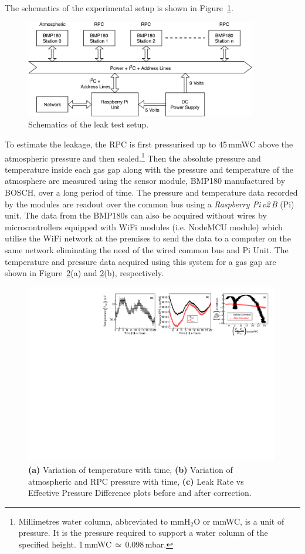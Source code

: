 \documentclass[a4paper,12pt,twoside]{article}
\begin{document}
The schematics of the experimental setup is shown in Figure~\ref{fig:schematics}.
\begin{figure}
  \centering
  \includegraphics[width=0.9\textwidth]{leaktest_setup.png}
  \caption{Schematics of the leak test setup.}
  \label{fig:schematics}
\end{figure}
To estimate the leakage, the RPC is first pressurised up to 45\,mmWC above the atmospheric pressure and then sealed.\footnote{Millimetres water column, abbreviated to mmH$_2$O or mmWC, is a unit of pressure. It is the pressure required to support a water column of the specified height. 1\,mmWC\,$\simeq$\,0.098\,mbar.} Then the absolute pressure and temperature inside each gas gap along with the pressure and temperature of the atmosphere are measured using the sensor module, BMP180 manufactured by BOSCH\cite{bmp180}, over a long period of time. The pressure and temperature data recorded by the modules are readout over the common bus using a \textit{Raspberry Pi\,v2\,B} (Pi) unit\cite{rpi}. The data from the BMP180s can also be acquired without wires by microcontrollers equipped with WiFi modules (i.e. NodeMCU module\cite{nodemcu2015}) which utilise the WiFi network at the premises to send the data to a computer on the same network eliminating the need of the wired common bus and Pi Unit. The temperature and pressure data acquired using this system for a gas gap are shown in Figure~\ref{fig:temp}(a) and \ref{fig:temp}(b), respectively.
\begin{figure}[h!]
  \centering
  \includegraphics[width=0.99\textwidth]{all_57_3x1.pdf}
  \caption{\textbf{(a)} Variation of temperature with time, \textbf{(b)} Variation of atmospheric and RPC pressure with time, \textbf{(c)} Leak Rate vs Effective Pressure Difference plots before and after correction.}
  \label{fig:temp}
\end{figure}
\end{document}
